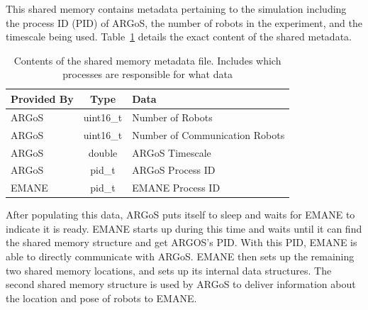 This shared memory contains metadata pertaining to the simulation including the process ID (PID) of ARGoS, the number of robots in the experiment, and the timescale being used.
Table~\ref{shm_meta} details the exact content of the shared metadata.
\begin{table}[!ht]
\centering
\caption{Contents of the shared memory metadata file. Includes which processes are responsible for what data}
\begin{adjustbox}{width=0.8\textwidth, center=\textwidth}
	\begin{tabular}{l|c|l}
		\multicolumn{1}{c|}{Provided By} & Type & Data \\ 
		\hline
		ARGoS & uint16\_t & Number of Robots \\
		ARGoS & uint16\_t & Number of Communication Robots \\
		ARGoS & double & ARGoS Timescale \\
		ARGoS & pid\_t & ARGoS Process ID \\
		EMANE & pid\_t & EMANE Process ID
	\end{tabular}
\end{adjustbox}
\label{shm_meta}
\end{table}
After populating this data, ARGoS puts itself to sleep and waits for EMANE to indicate it is ready.
EMANE starts up during this time and waits until it can find the shared memory structure and get ARGOS's PID.
With this PID, EMANE is able to directly communicate with ARGoS.
EMANE then sets up the remaining two shared memory locations, and sets up its internal data structures.
The second shared memory structure is used by ARGoS to deliver information about the location and pose of robots to EMANE.
